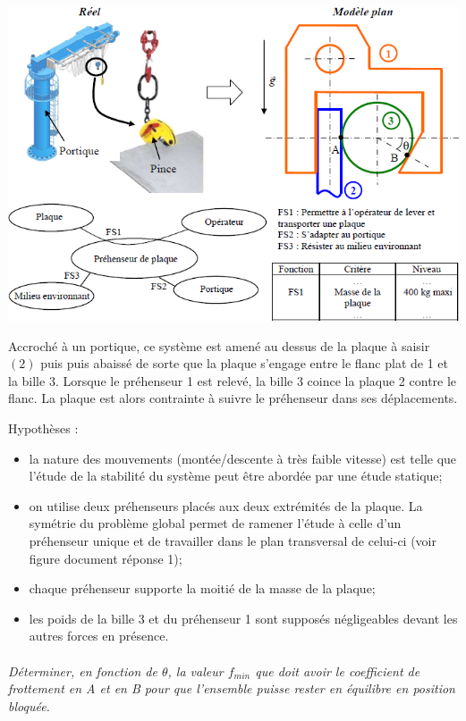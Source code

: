 \documentclass[11pt,oneside]{article}
\begin{document}
\begin{center}
\includegraphics[width=.9\textwidth]{png/img3.png}
\end{center}

Accroché à un portique, ce système est amené au dessus de la plaque à saisir $(2)$ puis 
puis abaissé de sorte que la plaque s'engage entre le flanc plat de 1 et la bille 3. Lorsque le préhenseur 1 est relevé, la bille 3 coince la plaque 2 contre le flanc. La plaque est alors contrainte à suivre le préhenseur dans ses déplacements.

Hypothèses : 
\begin{itemize}
\item la nature des mouvements (montée/descente à très faible vitesse) est telle que l'étude de la stabilité du système peut être abordée par une étude statique;
\item on utilise deux préhenseurs placés aux deux extrémités de la plaque. La symétrie du problème global permet de ramener l'étude à celle d'un préhenseur unique et de travailler dans le plan transversal de celui-ci (voir figure document réponse 1);
\item chaque préhenseur supporte la moitié de la masse de la plaque;
\item les poids de la bille 3 et du préhenseur 1 sont supposés négligeables devant les autres forces en présence.
\end{itemize}


\paragraph{}
\textit{Déterminer, en fonction de $\theta$, la valeur $f_{min}$ que doit avoir le coefficient de frottement en A et en B pour que l'ensemble puisse rester en équilibre en position bloquée.}
\end{document}
